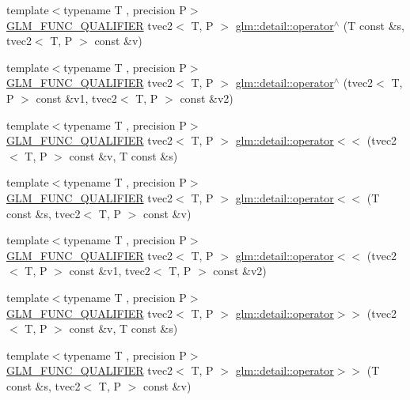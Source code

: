 \begin{DoxyCompactItemize}
{\footnotesize template$<$typename T , precision P$>$ }\\\hyperlink{setup_8hpp_a33fdea6f91c5f834105f7415e2a64407}{G\+L\+M\+\_\+\+F\+U\+N\+C\+\_\+\+Q\+U\+A\+L\+I\+F\+I\+ER} tvec2$<$ T, P $>$ \hyperlink{namespaceglm_1_1detail_a2571517f608b27af347d878eef38f002}{glm\+::detail\+::operator$^\wedge$} (T const \&s, tvec2$<$ T, P $>$ const \&v)
\item 
{\footnotesize template$<$typename T , precision P$>$ }\\\hyperlink{setup_8hpp_a33fdea6f91c5f834105f7415e2a64407}{G\+L\+M\+\_\+\+F\+U\+N\+C\+\_\+\+Q\+U\+A\+L\+I\+F\+I\+ER} tvec2$<$ T, P $>$ \hyperlink{namespaceglm_1_1detail_a39ed0144faa99bc5aaf0d05184996e74}{glm\+::detail\+::operator$^\wedge$} (tvec2$<$ T, P $>$ const \&v1, tvec2$<$ T, P $>$ const \&v2)
\item 
{\footnotesize template$<$typename T , precision P$>$ }\\\hyperlink{setup_8hpp_a33fdea6f91c5f834105f7415e2a64407}{G\+L\+M\+\_\+\+F\+U\+N\+C\+\_\+\+Q\+U\+A\+L\+I\+F\+I\+ER} tvec2$<$ T, P $>$ \hyperlink{namespaceglm_1_1detail_a44f89f82a1d7241b61434d920f92f85a}{glm\+::detail\+::operator$<$$<$} (tvec2$<$ T, P $>$ const \&v, T const \&s)
\item 
{\footnotesize template$<$typename T , precision P$>$ }\\\hyperlink{setup_8hpp_a33fdea6f91c5f834105f7415e2a64407}{G\+L\+M\+\_\+\+F\+U\+N\+C\+\_\+\+Q\+U\+A\+L\+I\+F\+I\+ER} tvec2$<$ T, P $>$ \hyperlink{namespaceglm_1_1detail_a094f6ee89ca2c82593f63b4b64447687}{glm\+::detail\+::operator$<$$<$} (T const \&s, tvec2$<$ T, P $>$ const \&v)
\item 
{\footnotesize template$<$typename T , precision P$>$ }\\\hyperlink{setup_8hpp_a33fdea6f91c5f834105f7415e2a64407}{G\+L\+M\+\_\+\+F\+U\+N\+C\+\_\+\+Q\+U\+A\+L\+I\+F\+I\+ER} tvec2$<$ T, P $>$ \hyperlink{namespaceglm_1_1detail_ac5713e187e282efa25df2813c3bfcf2e}{glm\+::detail\+::operator$<$$<$} (tvec2$<$ T, P $>$ const \&v1, tvec2$<$ T, P $>$ const \&v2)
\item 
{\footnotesize template$<$typename T , precision P$>$ }\\\hyperlink{setup_8hpp_a33fdea6f91c5f834105f7415e2a64407}{G\+L\+M\+\_\+\+F\+U\+N\+C\+\_\+\+Q\+U\+A\+L\+I\+F\+I\+ER} tvec2$<$ T, P $>$ \hyperlink{namespaceglm_1_1detail_a4fd78503f758442f6637c2af68f0886b}{glm\+::detail\+::operator$>$$>$} (tvec2$<$ T, P $>$ const \&v, T const \&s)
\item 
{\footnotesize template$<$typename T , precision P$>$ }\\\hyperlink{setup_8hpp_a33fdea6f91c5f834105f7415e2a64407}{G\+L\+M\+\_\+\+F\+U\+N\+C\+\_\+\+Q\+U\+A\+L\+I\+F\+I\+ER} tvec2$<$ T, P $>$ \hyperlink{namespaceglm_1_1detail_a6eeef158a21cb45859ea655b214253eb}{glm\+::detail\+::operator$>$$>$} (T const \&s, tvec2$<$ T, P $>$ const \&v)

\end{DoxyCompactItemize}
